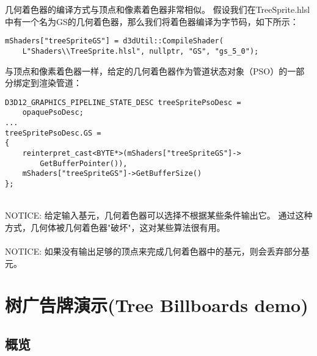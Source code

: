 \begin{flushleft}
几何着色器的编译方式与顶点和像素着色器非常相似。 假设我们在TreeSprite.hlsl中有一个名为GS的几何着色器，那么我们将着色器编译为字节码，如下所示：\\
\end{flushleft}

\begin{lstlisting}
mShaders["treeSpriteGS"] = d3dUtil::CompileShader(
    L"Shaders\\TreeSprite.hlsl", nullptr, "GS", "gs_5_0");
\end{lstlisting}

\begin{flushleft}
与顶点和像素着色器一样，给定的几何着色器作为管道状态对象（PSO）的一部分绑定到渲染管道：\\
\end{flushleft}

\begin{lstlisting}
D3D12_GRAPHICS_PIPELINE_STATE_DESC treeSpritePsoDesc =
    opaquePsoDesc;
...
treeSpritePsoDesc.GS =
{
    reinterpret_cast<BYTE*>(mShaders["treeSpriteGS"]->
        GetBufferPointer()),
    mShaders["treeSpriteGS"]->GetBufferSize()
};
\end{lstlisting}

\begin{flushleft}
~\\
NOTICE: 给定输入基元，几何着色器可以选择不根据某些条件输出它。 通过这种方式，几何体被几何着色器"破坏"，这对某些算法很有用。\\
~\\

NOTICE: 如果没有输出足够的顶点来完成几何着色器中的基元，则会丢弃部分基元。\\
\end{flushleft}

\section{树广告牌演示(Tree Billboards demo)}
\subsection{概览}






